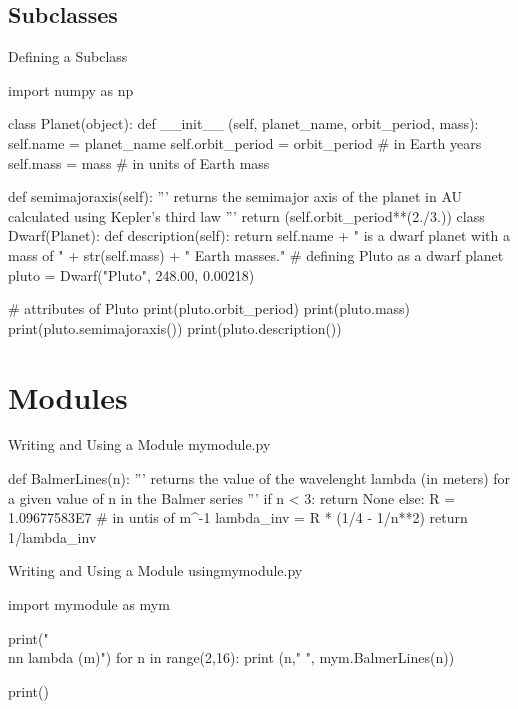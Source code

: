 \documentclass[11pt]{beamer}
\begin{document}
\subsection{Subclasses}
\begin{frame}[fragile]{Defining a Subclass}
\tiny
\begin{semiverbatim}
import numpy as np

class Planet(object):
    def __init__ (self, planet_name, orbit_period, mass):
        self.name = planet_name 
        self.orbit_period = orbit_period  # in Earth years
        self.mass = mass # in units of Earth mass
    
    def semimajoraxis(self):
        '''
        returns the semimajor axis of the planet in AU
        calculated using Kepler's third law 
        '''
        return (self.orbit_period**(2./3.))
\pause
class Dwarf(Planet):
    def description(self):
        return self.name + " is a dwarf planet with a mass of " + str(self.mass) + " Earth masses."
\pause
# defining Pluto as a dwarf planet 
pluto = Dwarf("Pluto", 248.00, 0.00218)

# attributes of Pluto 
print(pluto.orbit_period)
print(pluto.mass)
print(pluto.semimajoraxis())
print(pluto.description())
\end{semiverbatim}
\end{frame}

\section{Modules}
\begin{frame}[fragile]{Writing and Using a Module}
mymodule.py

\tiny
\begin{semiverbatim}
def BalmerLines(n):
    '''
    returns the value of the wavelenght lambda (in meters) 
    for a given value of n in the Balmer series
    '''
    if n < 3:
        return None
    else:
        R = 1.09677583E7 # in untis of m^-1
        lambda_inv = R * (1/4 - 1/n**2)
        return 1/lambda_inv
\end{semiverbatim}
\end{frame}

\begin{frame}[fragile]{Writing and Using a Module}
usingmymodule.py

\tiny
\begin{semiverbatim}
import mymodule as mym

print("\\nn        lambda (m)")
for n in range(2,16):
    print (n,"        ", mym.BalmerLines(n))

print()
\end{semiverbatim}
\end{frame}
\end{document}
